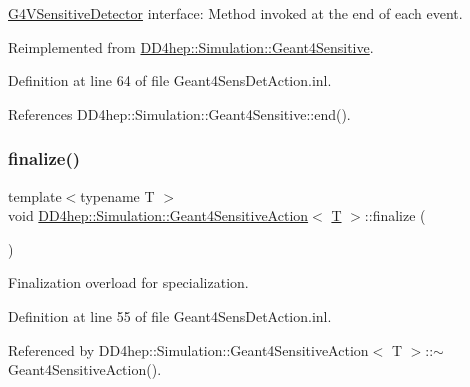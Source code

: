 \hyperlink{class_g4_v_sensitive_detector}{G4\+V\+Sensitive\+Detector} interface\+: Method invoked at the end of each event. 



Reimplemented from \hyperlink{class_d_d4hep_1_1_simulation_1_1_geant4_sensitive_abcce05101539a9941c06aada4625a608}{D\+D4hep\+::\+Simulation\+::\+Geant4\+Sensitive}.



Definition at line 64 of file Geant4\+Sens\+Det\+Action.\+inl.



References D\+D4hep\+::\+Simulation\+::\+Geant4\+Sensitive\+::end().

\hypertarget{class_d_d4hep_1_1_simulation_1_1_geant4_sensitive_action_acf98c9d63c8703544da1e68b6c1abeae}{}\label{class_d_d4hep_1_1_simulation_1_1_geant4_sensitive_action_acf98c9d63c8703544da1e68b6c1abeae} 
\subsubsection{\texorpdfstring{finalize()}{finalize()}}
{\footnotesize\ttfamily template$<$typename T $>$ \\
void \hyperlink{class_d_d4hep_1_1_simulation_1_1_geant4_sensitive_action}{D\+D4hep\+::\+Simulation\+::\+Geant4\+Sensitive\+Action}$<$ \hyperlink{class_t}{T} $>$\+::finalize (\begin{DoxyParamCaption}{ }\end{DoxyParamCaption})\hspace{0.3cm}{\ttfamily [virtual]}}



Finalization overload for specialization. 



Definition at line 55 of file Geant4\+Sens\+Det\+Action.\+inl.



Referenced by D\+D4hep\+::\+Simulation\+::\+Geant4\+Sensitive\+Action$<$ T $>$\+::$\sim$\+Geant4\+Sensitive\+Action().

\hypertarget{class_d_d4hep_1_1_simulation_1_1_geant4_sensitive_action_abbda4901e215cc296b7769ed9893d6de}{}\label{class_d_d4hep_1_1_simulation_1_1_geant4_sensitive_action_abbda4901e215cc296b7769ed9893d6de} 
